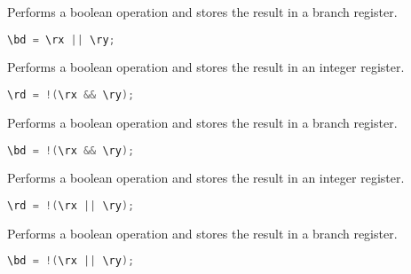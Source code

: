 Performs a boolean  operation and stores the result in a branch
register.

\begin{lstlisting}[numbers=none, basicstyle=\ttfamily\footnotesize, language=C++]
\bd = \rx || \ry;
\end{lstlisting}

Performs a boolean  operation and stores the result in an integer
register.

\begin{lstlisting}[numbers=none, basicstyle=\ttfamily\footnotesize, language=C++]
\rd = !(\rx && \ry);
\end{lstlisting}

Performs a boolean  operation and stores the result in a branch
register.

\begin{lstlisting}[numbers=none, basicstyle=\ttfamily\footnotesize, language=C++]
\bd = !(\rx && \ry);
\end{lstlisting}

Performs a boolean  operation and stores the result in an integer
register.

\begin{lstlisting}[numbers=none, basicstyle=\ttfamily\footnotesize, language=C++]
\rd = !(\rx || \ry);
\end{lstlisting}

Performs a boolean  operation and stores the result in a branch
register.

\begin{lstlisting}[numbers=none, basicstyle=\ttfamily\footnotesize, language=C++]
\bd = !(\rx || \ry);
\end{lstlisting}

